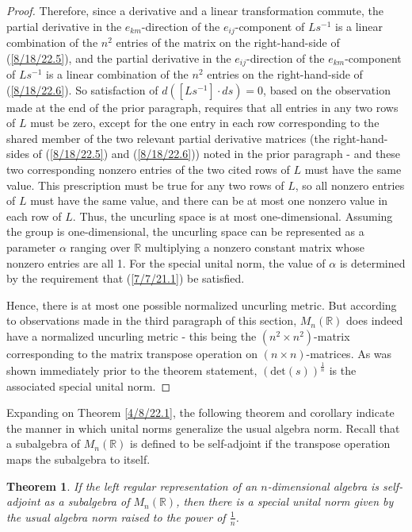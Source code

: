 \documentclass{amsart}
\numberwithin{equation}{section}
\newtheorem{theorem}{Theorem}
\theoremstyle{definition}
\numberwithin{theorem}{section}
\begin{document}
\begin{proof}
Therefore, since a derivative and a linear transformation commute, the partial derivative in the $e_{km}$-direction of the $e_{ij}$-component of $Ls^{-1}$ is a linear combination of the $n^2$ entries of the matrix on the right-hand-side of (\ref{8/18/22.5}), and  the partial derivative in the $e_{ij}$-direction of the $e_{km}$-component of $Ls^{-1}$ is a linear combination of the $n^2$ entries on the right-hand-side of (\ref{8/18/22.6}).
So satisfaction of \mbox{$d\left([Ls^{-1}]\cdot ds\right) = 0$,} based on the observation made at the end of the prior paragraph, requires that all entries in any two rows of $L$ must be zero, except for the one entry in each row corresponding to the shared member of the two relevant partial derivative matrices (the right-hand-sides of (\ref{8/18/22.5}) and (\ref{8/18/22.6})) noted in the prior paragraph - and these two corresponding nonzero entries of the two cited rows of $L$ must have the same value.  This prescription must be true for any two rows of $L$, so all nonzero entries of $L$ must have the same value, and there can be at most one nonzero value in each row of $L$.  Thus, the uncurling space is at most one-dimensional. Assuming the group is one-dimensional, the uncurling space can be represented as a parameter $\alpha$ ranging over $\mathbb{R}$ multiplying a nonzero constant matrix whose nonzero entries are all 1.  
For the special unital norm, the value of $\alpha$ is determined by the requirement that (\ref{7/7/21.1}) be satisfied. 


Hence, there is at most one possible normalized uncurling metric.  But according to observations made in the third paragraph of this section, $ M_n(\mathbb{R})$ does indeed have a normalized uncurling metric - this being the $(n^2\times n^2)$-matrix corresponding to the matrix transpose operation on $(n\times n)$-matrices.  As was shown immediately prior to the theorem statement, $(\mbox{det}(s))^{\frac{1}{n}}$ is the associated special unital norm.  
 \end{proof}
 
 Expanding on Theorem \ref{4/8/22.1}, the following theorem and corollary indicate the manner in which unital norms generalize the usual algebra norm.  Recall that a subalgebra of $M_n(\mathbb{R})$ is defined to be self-adjoint if the transpose operation maps the subalgebra to itself.
 
  \begin{theorem}\label{5/13/22.1} If the left regular representation of an $n$-dimensional algebra is self-adjoint as a subalgebra of $M_n(\mathbb{R})$, then there is a special unital norm given by the usual algebra norm raised to the power of $\frac{1}{n}$.
\end{theorem}
\end{document}
